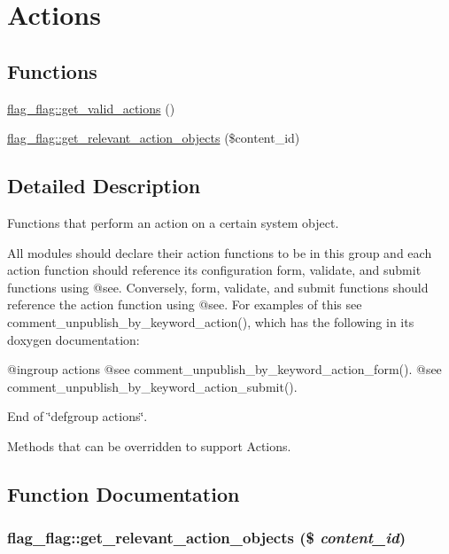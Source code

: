 \hypertarget{group__actions}{
\section{Actions}
\label{group__actions}
}
\subsection*{Functions}
\begin{CompactItemize}
\item 
\hyperlink{group__actions_gbe1aa2bfc551fab8660cc3bacfc9d509}{flag\_\-flag::get\_\-valid\_\-actions} ()
\item 
\hyperlink{group__actions_g8f1b472c7f072dbfa682cc5b3fac9be6}{flag\_\-flag::get\_\-relevant\_\-action\_\-objects} (\$content\_\-id)
\end{CompactItemize}


\subsection{Detailed Description}
Functions that perform an action on a certain system object.

All modules should declare their action functions to be in this group and each action function should reference its configuration form, validate, and submit functions using @see. Conversely, form, validate, and submit functions should reference the action function using @see. For examples of this see comment\_\-unpublish\_\-by\_\-keyword\_\-action(), which has the following in its doxygen documentation:

@ingroup actions @see comment\_\-unpublish\_\-by\_\-keyword\_\-action\_\-form(). @see comment\_\-unpublish\_\-by\_\-keyword\_\-action\_\-submit().

End of \char`\"{}defgroup actions\char`\"{}.

Methods that can be overridden to support Actions. 

\subsection{Function Documentation}
\hypertarget{group__actions_g8f1b472c7f072dbfa682cc5b3fac9be6}{
\subsubsection[{get\_\-relevant\_\-action\_\-objects}]{\setlength{\rightskip}{0pt plus 5cm}flag\_\-flag::get\_\-relevant\_\-action\_\-objects (\$ {\em content\_\-id})}}
\label{group__actions_g8f1b472c7f072dbfa682cc5b3fac9be6}


